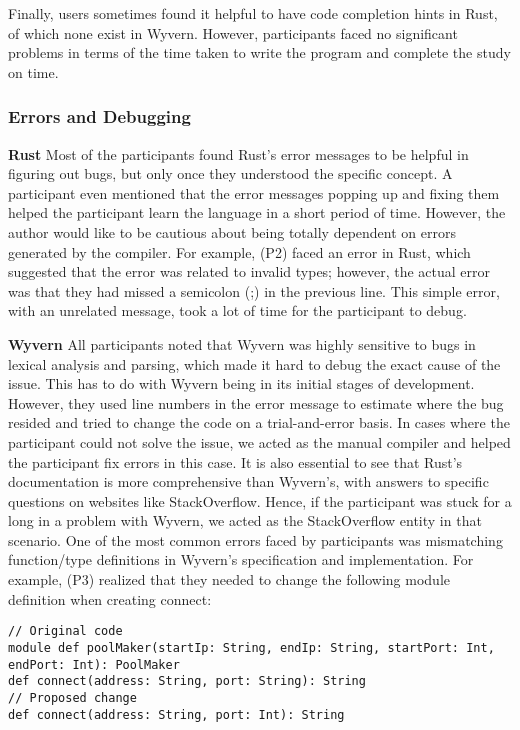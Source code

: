 Finally, users sometimes found it helpful to have code completion hints in Rust, of which none exist in Wyvern. However, participants faced no significant problems in terms of the time taken to write the program and complete the study on time. 

\subsubsection{Errors and Debugging}

\noindent
\textbf{Rust} Most of the participants found Rust's error messages to be helpful in figuring out bugs, but only once they understood the specific concept. A participant even mentioned that the error messages popping up and fixing them helped the participant learn the language in a short period of time. However, the author would like to be cautious about being totally dependent on errors generated by the compiler. For example, (P2) faced an error in Rust, which suggested that the error was related to invalid types; however, the actual error was that they had missed a semicolon (;) in the previous line. This simple error, with an unrelated message, took a lot of time for the participant to debug.

\noindent
\textbf{Wyvern} All participants noted that Wyvern was highly sensitive to bugs in lexical analysis and parsing, which made it hard to debug the exact cause of the issue. This has to do with Wyvern being in its initial stages of development. However, they used line numbers in the error message to estimate where the bug resided and tried to change the code on a trial-and-error basis. In cases where the participant could not solve the issue, we acted as the manual compiler and helped the participant fix errors in this case. It is also essential to see that Rust's documentation is more comprehensive than Wyvern's, with answers to specific questions on websites like StackOverflow. Hence, if the participant was stuck for a long in a problem with Wyvern, we acted as the StackOverflow entity in that scenario. One of the most common errors faced by participants was mismatching function/type definitions in Wyvern's specification and implementation. For example, (P3) realized that they needed to change the following module definition when creating connect: %

\begin{verbatim}
// Original code
module def poolMaker(startIp: String, endIp: String, startPort: Int, endPort: Int): PoolMaker
def connect(address: String, port: String): String 
// Proposed change
def connect(address: String, port: Int): String
\end{verbatim}

